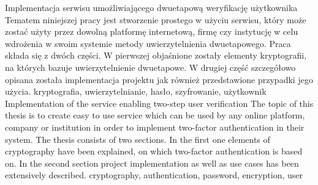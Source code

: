 \abstractpage
{Implementacja serwisu umożliwiającego dwuetapową weryfikację użytkownika}
{Tematem niniejszej pracy jest stworzenie prostego w użyciu serwisu, który może zostać użyty przez dowolną 
platformę internetową, firmę czy instytucję w celu wdrożenia w swoim systemie metody 
uwierzytelnienia dwuetapowego.
Praca składa się z dwóch części. 
W pierwszej objaśnione zostały elementy kryptografii, 
na których bazuje uwierzytelnienie dwuetapowe. 
W drugiej część szczegółowo opisana została implementacja projektu 
jak również przedstawione przypadki jego użycia. }
{kryptografia, uwierzytelnianie, hasło, szyfrowanie, użytkownik}
{Implementation of the service enabling two-step user verification}
{The topic of this thesis is to create easy to use service which can be used by any 
online platform, company or institution in order to implement two-factor authentication 
in their system.
The thesis consists of two sections. 
In the first one elements of cryptography have been explained, on which two-factor authentication is based on. 
In the second section project implementation as well as use cases has been extensively described.}
{cryptography, authentication, password, encryption, user}